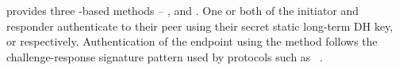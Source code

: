 %    
\mEdhoc{} provides three \mStat-based methods -- \mSigStat{}, \mStatStat{} and
\mStatSig{}.
%
One or both of the initiator and responder authenticate to their peer using
their secret static long-term DH key, \mLtki{} or \mLtkr{} respectively.
%
Authentication of the endpoint using the \mStat{} method follows the
challenge-response signature pattern used by protocols such as
\mOptls~\cite{DBLP:conf/eurosp/KrawczykW16}.
%
